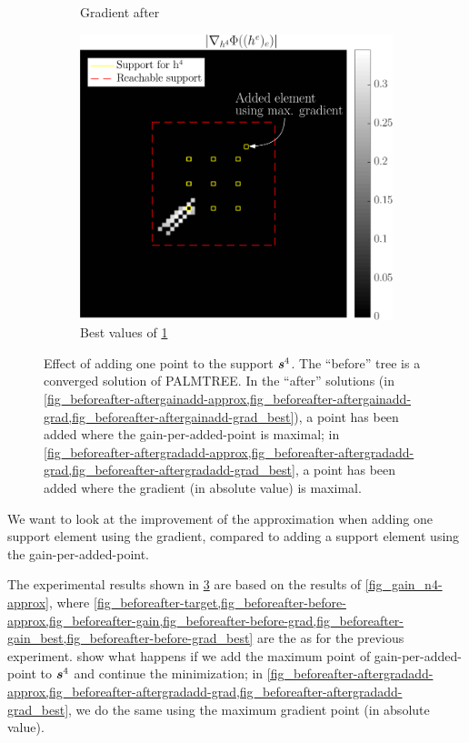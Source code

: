 \begin{figure}
\begin{subfigure}[b]{0.34\linewidth}
\caption{Gradient after}\label{fig_beforeafter-aftergradadd-grad}
\end{subfigure}
\begin{subfigure}[b]{0.34\linewidth}\centering
\includegraphics[width=\linewidth]{figures/before_after/gradafter_partgrad4_bestvalues.pdf}
\caption{Best values of \ref{fig_beforeafter-aftergradadd-grad}}\label{fig_beforeafter-aftergradadd-grad_best}
\end{subfigure}

\caption{Effect of adding one point to the support $\bm{s}^4$. The “before” tree is a converged solution of \ac{PALMTREE}. In the “after” solutions (in \cref{fig_beforeafter-aftergainadd-approx,fig_beforeafter-aftergainadd-grad,fig_beforeafter-aftergainadd-grad_best}), a point has been added where the gain-per-added-point is maximal; in \cref{fig_beforeafter-aftergradadd-approx,fig_beforeafter-aftergradadd-grad,fig_beforeafter-aftergradadd-grad_best}, a point has been added where the gradient (in absolute value) is maximal.}\label{fig_beforeafter}
\end{figure}

We want to look at the improvement of the approximation when adding one support element using the gradient, compared to adding a support element using the gain-per-added-point.

\noindent 
The experimental results shown in \cref{fig_beforeafter} are based on the results of \cref{fig_gain_n4-approx}, where \cref{fig_beforeafter-target,fig_beforeafter-before-approx,fig_beforeafter-gain,fig_beforeafter-before-grad,fig_beforeafter-gain_best,fig_beforeafter-before-grad_best} are the as for the previous experiment.
 show what happens if we add the maximum point of gain-per-added-point to $\bm{s}^4$ and continue the minimization; in \cref{fig_beforeafter-aftergradadd-approx,fig_beforeafter-aftergradadd-grad,fig_beforeafter-aftergradadd-grad_best}, we do the same using the maximum gradient point (in absolute value). 

